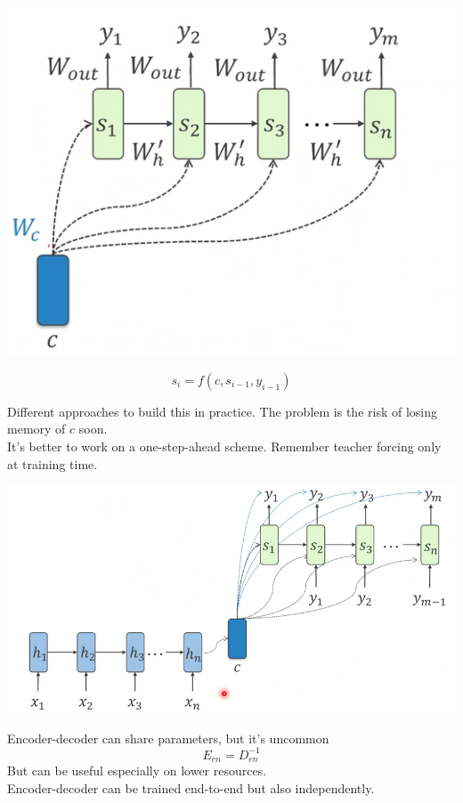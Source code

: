 \documentclass[10pt]{report}
\begin{document}
\begin{list}{}{}
\begin{center}
		\includegraphics[scale=0.5]{110.png}
	\end{center}
	$$s_i = f(c, s_{i-1}, y_{i-1})$$
\end{list}
Different approaches to build this in practice. The problem is the risk of losing memory of $c$ soon.\\
It's better to work on a one-step-ahead scheme. Remember teacher forcing only at training time.
\begin{center}
	\includegraphics[scale=0.5]{111.png}
\end{center}
Encoder-decoder can share parameters, but it's uncommon
$$E_{en} = D^{-1}_{en}$$
But can be useful especially on lower resources.\\
Encoder-decoder can be trained end-to-end but also independently.
\end{document}
